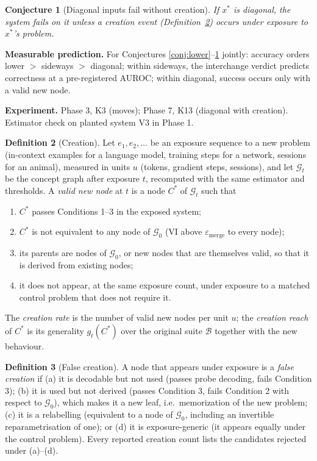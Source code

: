 \documentclass[11pt]{article}
\theoremstyle{definition}
\newtheorem{definition}{Definition}[section]
\theoremstyle{plain}
\newtheorem{conjecture}[definition]{Conjecture}
\theoremstyle{remark}
\newcommand{\B}{\mathcal{B}}
\newcommand{\G}{\mathcal{G}}
\newcommand{\VI}{\mathrm{VI}}
\newcommand{\predict}[1]{\par\noindent\textbf{Measurable prediction.} #1}
\newcommand{\experiment}[1]{\par\noindent\textbf{Experiment.} #1\par\medskip}
\begin{document}
\begin{conjecture}[Diagonal inputs fail without creation]\label{conj:diag}
If $x^\ast$ is diagonal, the system fails on it unless a creation event
(Definition~\ref{def:creation}) occurs under exposure to $x^\ast$'s problem.
\end{conjecture}
\predict{For Conjectures \ref{conj:lower}--\ref{conj:diag} jointly: accuracy
orders lower $>$ sideways $>$ diagonal; within sideways, the interchange
verdict predicts correctness at a pre-registered AUROC; within diagonal,
success occurs only with a valid new node.}
\experiment{Phase 3, K3 (moves); Phase 7, K13 (diagonal with creation).
Estimator check on planted system V3 in Phase 1.}

\begin{definition}[Creation]\label{def:creation}
Let $e_1,e_2,\dots$ be an exposure sequence to a new problem (in-context
examples for a language model, training steps for a network, sessions for an
animal), measured in units $u$ (tokens, gradient steps, sessions), and let
$\G_t$ be the concept graph after exposure $t$, recomputed with the same
estimator and thresholds. A \emph{valid new node} at $t$ is a node $C^\ast$ of
$\G_t$ such that
\begin{enumerate}[label=(\roman*)]
\item $C^\ast$ passes Conditions 1--3 in the exposed system;
\item $C^\ast$ is not equivalent to any node of $\G_0$
($\VI$ above $\varepsilon_{\mathrm{merge}}$ to every node);
\item its parents are nodes of $\G_0$, or new nodes that are themselves valid,
so that it is derived from existing nodes;
\item it does not appear, at the same exposure count, under exposure to a
matched control problem that does not require it.
\end{enumerate}
The \emph{creation rate} is the number of valid new nodes per unit $u$; the
\emph{creation reach} of $C^\ast$ is its generality $g_t(C^\ast)$ over the
original suite $\B$ together with the new behaviour.
\end{definition}

\begin{definition}[False creation]\label{def:falsecreation}
A node that appears under exposure is a \emph{false creation} if
(a) it is decodable but not used (passes probe decoding, fails Condition 3);
(b) it is used but not derived (passes Condition 3, fails Condition 2 with
respect to $\G_0$), which makes it a new leaf, i.e.\ memorization of the new
problem;
(c) it is a relabelling (equivalent to a node of $\G_0$, including an
invertible reparametrisation of one); or
(d) it is exposure-generic (it appears equally under the control problem).
Every reported creation count lists the candidates rejected under (a)--(d).
\end{definition}
\end{document}

